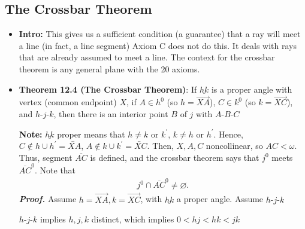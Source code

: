 \documentclass{report}
\begin{document}
    \subsection{The Crossbar Theorem}
    \begin{itemize}
        \item \textbf{Intro:} This gives us a sufficient condition (a guarantee) that a ray will meet a line (in fact, a line segment)
            \bigbreak \noindent 
            Axiom C does not do this. It deals with rays that are already assumed to meet a line.
            \bigbreak \noindent 
            The context for the crossbar theorem is any general plane with the 20 axioms.
        \item \textbf{Theorem 12.4 (The Crossbar Theorem)}: If $\underline{hk}$ is a proper angle with vertex (common endpoint) $X$, if $A \in h^{0}$ (so $h = \overrightarrow{XA}$), $C \in k^{0}$ (so $k = \overrightarrow{XC}$), and $ h\text{-}j\text{-}k$, then there is an interior point $B$ of $j$ with $ A\text{-}B\text{-}C$
            \bigbreak \noindent 
            \begin{figure}[ht]
                \centering
                \label{fig:cbt}
            \end{figure}
            \bigbreak \noindent 
            \textbf{Note:} $\underline{hk}$ proper means that $h \ne k$ or $k^{\prime}$, $ k \ne h$ or $h^{\prime}$. Hence, $C \not\in h \cup h^{\prime} = \overleftrightarrow{XA}$, $A \not\in k\cup k^{\prime} = \overleftrightarrow{XC} $. Then, $X,A,C$ noncollinear, so $AC<\omega$. 
            \bigbreak \noindent 
            Thus, segment $\overline{AC}$ is defined, and the crossbar theorem says that $j^{0}$ meets $\overline{AC}^{0} $. Note that
            \begin{align*}
                j^{0} \cap \overline{AC}^{0} \ne \varnothing
            .\end{align*}
            \bigbreak \noindent 
            \textbf{\textit{Proof.}} Assume $h = \overrightarrow{XA}, k = \overrightarrow{XC}$, with $\underline{hk}$ a proper angle. Assume $ h\text{-}j\text{-}k$
            \bigbreak \noindent 
            \begin{figure}[ht]
                \centering
                \label{fig:cbt2}
            \end{figure}
            \bigbreak \noindent 
            $ h\text{-}j\text{-}k$ implies $h,j,k$ distinct, which implies $0 < hj < hk < jk $
            \bigbreak \noindent 

\end{itemize}
\end{document}
